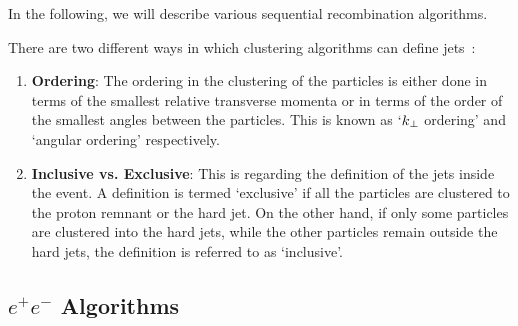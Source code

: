 In the following, we will describe various sequential recombination algorithms. 

There are two different ways in which clustering algorithms can define jets~:
\begin{enumerate}
	\item{\textbf{Ordering}}: The ordering in the clustering of the particles is either done in terms of the smallest relative transverse momenta or in terms of the order of the smallest angles between the particles. This is known as $`k_\perp$ ordering' and `angular ordering' respectively. 
	\item{\textbf{Inclusive vs. Exclusive}}: This is regarding the definition of the jets inside the event. A definition is termed `exclusive' if all the particles are clustered to the proton remnant or the hard jet. On the other hand, if only some particles are clustered into the hard jets, while the other particles remain outside the hard jets, the definition is referred to as `inclusive'. 
\end{enumerate}

\subsection{$e^+e^-$ Algorithms}
